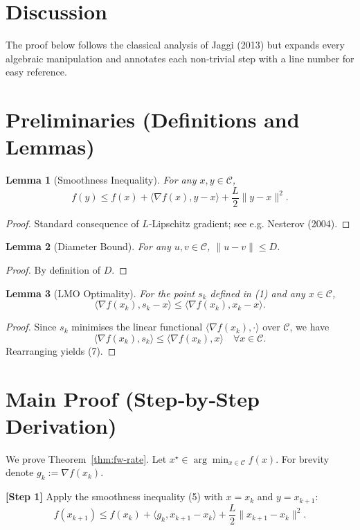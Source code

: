 \documentclass{article}
\newtheorem{lemma}{Lemma}
\begin{document}
\section*{Discussion}
The proof below follows the classical analysis of Jaggi (2013) but expands every algebraic manipulation and annotates each non‑trivial step with a line number for easy reference.

\newpage
\section*{Preliminaries (Definitions and Lemmas)}
\begin{lemma}[Smoothness Inequality]\label{lem:smooth}
For any $x,y\in\mathcal C$,
\[
f(y)\le f(x)+\langle\nabla f(x),y-x\rangle+\frac{L}{2}\|y-x\|^{2}.
\tag{5}
\]
\end{lemma}
\begin{proof}
Standard consequence of $L$‑Lipschitz gradient; see e.g. Nesterov (2004). \qedhere
\end{proof}

\begin{lemma}[Diameter Bound]\label{lem:diameter}
For any $u,v\in\mathcal C$, $\|u-v\|\le D$.
\]
\end{lemma}
\begin{proof}
By definition of $D$. \qedhere
\end{proof}

\begin{lemma}[LMO Optimality]\label{lem:lmo}
For the point $s_k$ defined in (1) and any $x\in\mathcal C$,
\[
\langle\nabla f(x_k),s_k-x\rangle\le\langle\nabla f(x_k),x_k-x\rangle .
\tag{7}
\]
\end{lemma}
\begin{proof}
Since $s_k$ minimises the linear functional $\langle\nabla f(x_k),\cdot\rangle$ over $\mathcal C$, we have
\[
\langle\nabla f(x_k),s_k\rangle\le\langle\nabla f(x_k),x\rangle\quad\forall x\in\mathcal C.
\]
Rearranging yields (7). \qedhere
\end{proof}

\section*{Main Proof (Step‑by‑Step Derivation)}
We prove Theorem~\ref{thm:fw-rate}. Let $x^\star\in\arg\min_{x\in\mathcal C}f(x)$.  
For brevity denote $g_k:=\nabla f(x_k)$.

\bigskip
\noindent\textbf{[Step 1]} Apply the smoothness inequality (5) with $x=x_k$ and $y=x_{k+1}$:
\[
f(x_{k+1})\le f(x_k)+\langle g_k, x_{k+1}-x_k\rangle+\frac{L}{2}\|x_{k+1}-x_k\|^{2}.
\tag{8}
\]
\end{document}
